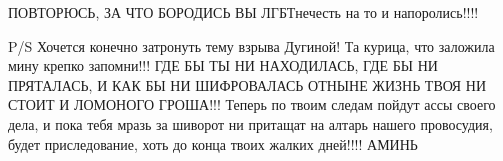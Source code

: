 ПОВТОРЮСЬ, ЗА ЧТО БОРОДИСЬ ВЫ ЛГБТнечесть на то и напоролись!!!!

P/S Хочется конечно затронуть тему взрыва Дугиной! Та курица, что заложила мину крепко запомни!!! ГДЕ БЫ ТЫ НИ НАХОДИЛАСЬ, ГДЕ БЫ НИ ПРЯТАЛАСЬ, И КАК БЫ НИ ШИФРОВАЛАСЬ ОТНЫНЕ ЖИЗНЬ ТВОЯ НИ СТОИТ И ЛОМОНОГО ГРОША!!! Теперь по твоим следам пойдут ассы своего дела, и пока тебя мразь за шиворот ни притащат на алтарь нашего провосудия, будет приследование, хоть до конца твоих жалких дней!!!! АМИНЬ

